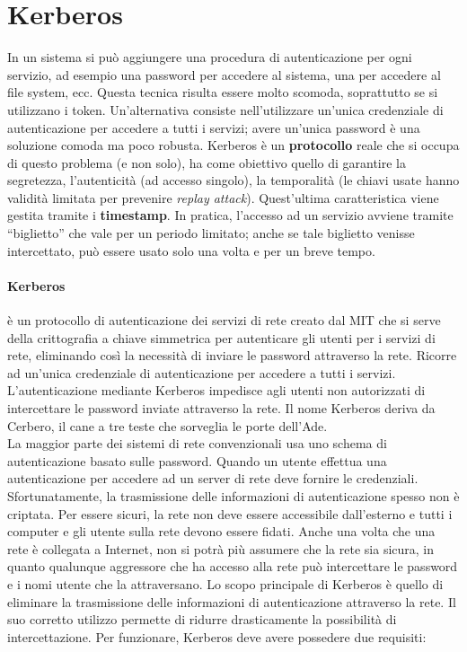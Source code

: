 \section{Kerberos}

In un sistema si può aggiungere una procedura di autenticazione per ogni servizio,
ad esempio una password per accedere al sistema, una per accedere al file system,
ecc. Questa tecnica risulta essere molto scomoda, soprattutto se si utilizzano
i token. Un'alternativa consiste nell'utilizzare un'unica credenziale di
autenticazione per accedere a tutti i servizi; avere un'unica password è una
soluzione comoda ma poco robusta.
Kerberos è un \textbf{protocollo} reale che si occupa di questo problema (e non solo),
ha come obiettivo quello di garantire la segretezza, l'autenticità
(ad accesso singolo), la temporalità (le chiavi usate hanno validità limitata
per prevenire \textit{replay attack}).
Quest'ultima caratteristica viene gestita tramite
i \textbf{timestamp}. In pratica, l'accesso ad un servizio avviene tramite
``biglietto'' che vale per un periodo limitato; anche se tale biglietto venisse
intercettato, può essere usato solo una volta e per un breve tempo.

\paragraph{Kerberos}
è un protocollo di autenticazione dei servizi di rete creato dal MIT che si
serve della crittografia a chiave simmetrica per autenticare gli utenti per i
servizi di rete, eliminando così la necessità di inviare le password attraverso
la rete. Ricorre ad un'unica credenziale di autenticazione per accedere a tutti
i servizi. L'autenticazione mediante Kerberos impedisce agli utenti non autorizzati
di intercettare le password inviate attraverso la rete.
Il nome Kerberos deriva da Cerbero, il cane a tre teste che sorveglia
le porte dell'Ade.\\

La maggior parte dei sistemi di rete convenzionali usa uno schema di
autenticazione basato sulle password. Quando un utente effettua una
autenticazione per accedere ad un server di rete deve fornire le credenziali.
Sfortunatamente, la trasmissione delle informazioni di autenticazione spesso
non è criptata. Per essere sicuri, la rete non deve essere accessibile
dall'esterno e tutti i computer e gli utente sulla rete devono essere fidati.
Anche una volta che una rete è collegata a Internet, non si potrà più assumere
che la rete sia sicura, in quanto qualunque aggressore che ha accesso alla rete
può intercettare le password e i nomi utente che la attraversano.
Lo scopo principale di Kerberos è quello di eliminare la trasmissione delle
informazioni di autenticazione attraverso la rete.
Il suo corretto utilizzo permette di ridurre drasticamente la possibilità di
intercettazione. Per funzionare, Kerberos deve avere possedere due requisiti:

